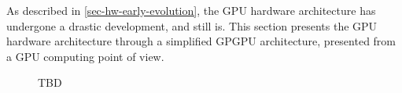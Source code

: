 As described in \cref{sec-hw-early-evolution}, the GPU hardware architecture has undergone a drastic development, and still is.
This section presents the GPU hardware architecture through a simplified GPGPU architecture, presented from a GPU computing point of view.


\begin{figure}[ht]
	\centering
	\caption{TBD}
	\label{fig:hw-gpu}
\end{figure}